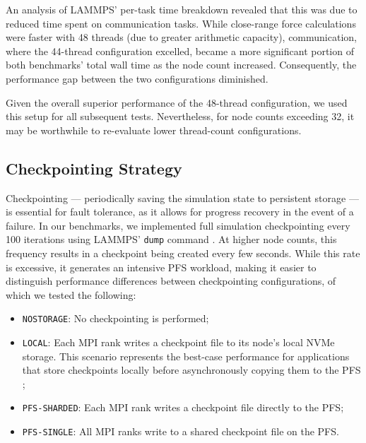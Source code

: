 \documentclass[sigplan, nonacm, screen]{acmart}
\begin{document}
An analysis of LAMMPS' per-task time breakdown revealed that this was due to reduced time spent on
communication tasks. While close-range force calculations were faster with 48 threads (due to
greater arithmetic capacity), communication, where the 44-thread configuration excelled, became a
more significant portion of both benchmarks' total wall time as the node count increased.
Consequently, the performance gap between the two configurations diminished.

Given the overall superior performance of the 48-thread configuration, we used this setup for all
subsequent tests. Nevertheless, for node counts exceeding 32, it may be worthwhile to re-evaluate
lower thread-count configurations.

\subsection{Checkpointing Strategy} %
\label{tuning-checkpointing-strategy}

Checkpointing --- periodically saving the simulation state to persistent storage --- is essential
for fault tolerance, as it allows for progress recovery in the event of a failure. In our
benchmarks, we implemented full simulation checkpointing every 100 iterations using LAMMPS'
\texttt{dump} command \cite{lammps-dump}. At higher node counts, this frequency results in a
checkpoint being created every few seconds. While this rate is excessive, it generates an intensive
PFS workload, making it easier to distinguish performance differences between checkpointing
configurations, of which we tested the following:

\begin{itemize}
    \item \texttt{NOSTORAGE}: No checkpointing is performed;

    \item \texttt{LOCAL}: Each MPI rank writes a checkpoint file to its node's local NVMe storage.
                          This scenario represents the best-case performance for applications that
                          store checkpoints locally before asynchronously copying them to the PFS
                          \cite{tiered-llm-checkpointing, hacc};

    \item \texttt{PFS-SHARDED}: Each MPI rank writes a checkpoint file directly to the PFS;

    \item \texttt{PFS-SINGLE}: All MPI ranks write to a shared checkpoint file on the PFS.
\end{itemize}
\end{document}
